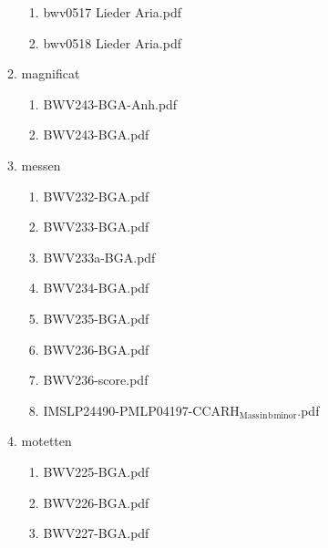 \documentclass[11pt]{article}
\begin{document}
\begin{enumerate}
\begin{enumerate}
\begin{enumerate}
\item bwv0517   Lieder Aria.pdf
\label{sec-1-1-1-1-44-6-7-4-79}

\item bwv0518   Lieder Aria.pdf
\label{sec-1-1-1-1-44-6-7-4-80}
\end{enumerate}

\item magnificat
\label{sec-1-1-1-1-44-6-7-5}
\begin{enumerate}
\item BWV243-BGA-Anh.pdf
\label{sec-1-1-1-1-44-6-7-5-1}

\item BWV243-BGA.pdf
\label{sec-1-1-1-1-44-6-7-5-2}
\end{enumerate}

\item messen
\label{sec-1-1-1-1-44-6-7-6}
\begin{enumerate}
\item BWV232-BGA.pdf
\label{sec-1-1-1-1-44-6-7-6-1}

\item BWV233-BGA.pdf
\label{sec-1-1-1-1-44-6-7-6-2}

\item BWV233a-BGA.pdf
\label{sec-1-1-1-1-44-6-7-6-3}

\item BWV234-BGA.pdf
\label{sec-1-1-1-1-44-6-7-6-4}

\item BWV235-BGA.pdf
\label{sec-1-1-1-1-44-6-7-6-5}

\item BWV236-BGA.pdf
\label{sec-1-1-1-1-44-6-7-6-6}

\item BWV236-score.pdf
\label{sec-1-1-1-1-44-6-7-6-7}

\item IMSLP24490-PMLP04197-CCARH$_{\text{Mass}}$$_{\text{in}}$$_{\text{b}}$$_{\text{minor}}$.pdf
\label{sec-1-1-1-1-44-6-7-6-8}
\end{enumerate}

\item motetten
\label{sec-1-1-1-1-44-6-7-7}
\begin{enumerate}
\item BWV225-BGA.pdf
\label{sec-1-1-1-1-44-6-7-7-1}

\item BWV226-BGA.pdf
\label{sec-1-1-1-1-44-6-7-7-2}

\item BWV227-BGA.pdf
\label{sec-1-1-1-1-44-6-7-7-3}


\end{enumerate}
\end{enumerate}
\end{enumerate}
\end{document}

